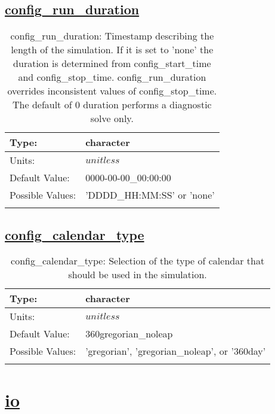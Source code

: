 \subsection[config\_run\_duration]{\hyperref[sec:nm_tab_time_management]{config\_run\_duration}}
\label{subsec:nm_sec_config_run_duration}
\begin{center}
\begin{longtable}{| p{2.0in} | p{4.0in} |}
    \hline
    Type: & character \\
    \hline
    Units: & $unitless$ \\
    \hline
    Default Value: & 0000-00-00\_00:00:00 \\
    \hline
    Possible Values: & 'DDDD\_HH:MM:SS' or 'none' \\
    \hline
    \caption{config\_run\_duration: Timestamp describing the length of the simulation. If it is set to 'none' the duration is determined from config\_start\_time and config\_stop\_time. config\_run\_duration overrides inconsistent values of config\_stop\_time.  The default of 0 duration performs a diagnostic solve only.}
\end{longtable}
\end{center}
\subsection[config\_calendar\_type]{\hyperref[sec:nm_tab_time_management]{config\_calendar\_type}}
\label{subsec:nm_sec_config_calendar_type}
\begin{center}
\begin{longtable}{| p{2.0in} | p{4.0in} |}
    \hline
    Type: & character \\
    \hline
    Units: & $unitless$ \\
    \hline
    Default Value: & 360gregorian\_noleap \\
    \hline
    Possible Values: & 'gregorian', 'gregorian\_noleap', or '360day' \\
    \hline
    \caption{config\_calendar\_type: Selection of the type of calendar that should be used in the simulation.}
\end{longtable}
\end{center}
\section[io]{\hyperref[sec:nm_tab_io]{io}}
\label{sec:nm_sec_io}

